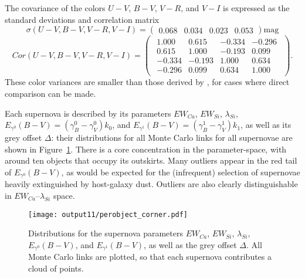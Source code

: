 \documentclass{aastex61}   	%
\begin{document}
 \color{black}
The  covariance of the colors $U-V$, $B-V$, $V-R$, and $V-I$ is
expressed as the standard deviations and
 correlation matrix
 \begin{equation}
 \sigma(U-V, B-V, V-R, V-I)=
 \begin{pmatrix}
0.068 & 0.034& 0.023 & 0.053
  \end{pmatrix} \text{mag}
 \label{color_sd:eqn}
   \end{equation}
 \begin{equation}
 Cor(U-V, B-V, V-R, V-I)=
\begin{pmatrix}
\begin{array}{rrrr}
1.000 & 0.615 & -0.334 & -0.296 \\
0.615 & 1.000 & -0.193 & 0.099 \\
-0.334 & -0.193 & 1.000 & 0.634 \\
-0.296 & 0.099 & 0.634 & 1.000 
\end{array}
\end{pmatrix}.
  \label{color_cor:eqn}
 \end{equation}
These color variances are smaller than those derived by \citet{2003A&A...404..901N, 2007ApJ...659..122J}, for cases where direct comparison can be made.

Each supernova is described by its parameters $EW_{Ca}$, $EW_{Si}$, $\lambda_{Si}$, $E_{\gamma^0}(B-V)=(\gamma^0_B-\gamma^0_V)k_0$, and
$E_{\gamma^1}(B-V)=(\gamma^1_B-\gamma^1_V)k_1$, as well as its grey offset
$\Delta$: their distributions for all Monte Carlo links for all supernovae are shown in Figure~\ref{perobject:fig}.
There is a core concentration in the  parameter-space, with around ten objects that occupy its outskirts.
Many outliers appear in the red tail of $E_{\gamma^0}(B-V)$, as would be expected for the (infrequent) selection of supernovae
heavily extinguished by host-galaxy dust.
Outliers  are also clearly distinguishable in  $EW_{Ca}$--$\lambda_{Si}$ space.

\begin{figure}[htbp] %
   \centering
   \texttt{[image: output11/perobject\_corner.pdf]} 
   \caption{Distributions for the supernova parameters $EW_{Ca}$, $EW_{Si}$, $\lambda_{Si}$, $E_{\gamma^0}(B-V)$, and $E_{\gamma^1}(B-V)$, as well as the grey offset
$\Delta$.  All Monte Carlo links are plotted, so that each supernova contributes a cloud of points.
   \label{perobject:fig}}
\end{figure}
\end{document}
